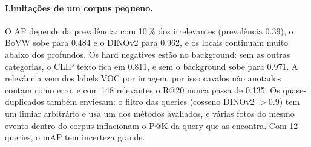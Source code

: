 \paragraph{Limitações de um corpus pequeno.}
O AP depende da prevalência: com 10\,\% dos irrelevantes (prevalência 0.39), o
BoVW sobe para 0.484 e o DINOv2 para 0.962, e os locais continuam muito abaixo
dos profundos. Os hard negatives estão no background: sem as outras categorias,
o CLIP texto fica em 0.811, e sem o background sobe para 0.971. A relevância vem
dos labels VOC por imagem, por isso cavalos não anotados contam como erro, e com
148 relevantes o R@20 nunca passa de 0.135. Os quase-duplicados também
enviesam: o filtro das queries (cosseno DINOv2 $>0.9$) tem um limiar arbitrário e
usa um dos métodos avaliados, e várias fotos do mesmo evento dentro do corpus
inflacionam o P@K da query que as encontra. Com 12 queries, o mAP tem incerteza
grande.
